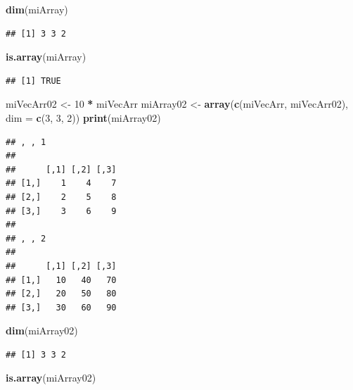\documentclass[]{book}
\newenvironment{Shaded}{\begin{snugshade}}{\end{snugshade}}
\newcommand{\KeywordTok}[1]{\textcolor[rgb]{0.13,0.29,0.53}{\textbf{#1}}}
\newcommand{\DataTypeTok}[1]{\textcolor[rgb]{0.13,0.29,0.53}{#1}}
\newcommand{\DecValTok}[1]{\textcolor[rgb]{0.00,0.00,0.81}{#1}}
\newcommand{\StringTok}[1]{\textcolor[rgb]{0.31,0.60,0.02}{#1}}
\newcommand{\OperatorTok}[1]{\textcolor[rgb]{0.81,0.36,0.00}{\textbf{#1}}}
\newcommand{\NormalTok}[1]{#1}
\begin{document}
\begin{Shaded}
\begin{Highlighting}[]
\KeywordTok{dim}\NormalTok{(miArray)}
\end{Highlighting}
\end{Shaded}

\begin{verbatim}
## [1] 3 3 2
\end{verbatim}

\begin{Shaded}
\begin{Highlighting}[]
\KeywordTok{is.array}\NormalTok{(miArray)}
\end{Highlighting}
\end{Shaded}

\begin{verbatim}
## [1] TRUE
\end{verbatim}

\begin{Shaded}
\begin{Highlighting}[]
\NormalTok{miVecArr02 <-}\StringTok{ }\DecValTok{10} \OperatorTok{*}\StringTok{ }\NormalTok{miVecArr}
\NormalTok{miArray02 <-}\StringTok{ }\KeywordTok{array}\NormalTok{(}\KeywordTok{c}\NormalTok{(miVecArr, miVecArr02), }\DataTypeTok{dim =} \KeywordTok{c}\NormalTok{(}\DecValTok{3}\NormalTok{, }\DecValTok{3}\NormalTok{, }\DecValTok{2}\NormalTok{))}
\KeywordTok{print}\NormalTok{(miArray02)}
\end{Highlighting}
\end{Shaded}

\begin{verbatim}
## , , 1
## 
##      [,1] [,2] [,3]
## [1,]    1    4    7
## [2,]    2    5    8
## [3,]    3    6    9
## 
## , , 2
## 
##      [,1] [,2] [,3]
## [1,]   10   40   70
## [2,]   20   50   80
## [3,]   30   60   90
\end{verbatim}

\begin{Shaded}
\begin{Highlighting}[]
\KeywordTok{dim}\NormalTok{(miArray02)}
\end{Highlighting}
\end{Shaded}

\begin{verbatim}
## [1] 3 3 2
\end{verbatim}

\begin{Shaded}
\begin{Highlighting}[]
\KeywordTok{is.array}\NormalTok{(miArray02)}
\end{Highlighting}
\end{Shaded}
\end{document}
